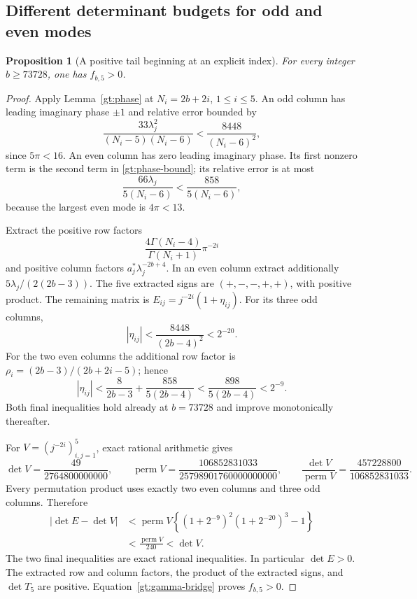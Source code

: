 \documentclass[11pt,a4paper]{article}
\newtheorem{proposition}[theorem]{Proposition}
\theoremstyle{definition}
\theoremstyle{remark}
\numberwithin{equation}{section}
\begin{document}
\subsection{Different determinant budgets for odd and even modes}

\begin{proposition}[A positive tail beginning at an explicit index]
\label{gt:positive-tail}
For every integer $b\ge73728$, one has $f_{b,5}>0$.
\end{proposition}

\begin{proof}
Apply Lemma~\ref{gt:phase} at $N_i=2b+2i$, $1\le i\le5$.
An odd column has leading imaginary phase $\pm1$ and relative
error bounded by
\[
 \frac{33\lambda_j^2}{(N_i-5)(N_i-6)}
                       <\frac{8448}{(N_i-6)^2},
\]
since $5\pi<16$. An even column has zero leading imaginary phase.
Its first nonzero term is the second term in
\eqref{gt:phase-bound}; its relative error is at most
\[
 \frac{66\lambda_j}{5(N_i-6)}
                       <\frac{858}{5(N_i-6)},
\]
because the largest even mode is $4\pi<13$.

Extract the positive row factors
\[
             \frac{4\Gamma(N_i-4)}{\Gamma(N_i+1)}\pi^{-2i}
\]
and positive column factors $a_j^*\lambda_j^{-2b+4}$.
In an even column extract additionally
$5\lambda_j/(2(2b-3))$. The five extracted signs are
$(+,-,-,+,+)$, with positive product. The remaining matrix is
$E_{ij}=j^{-2i}(1+\eta_{ij})$.
For its three odd columns,
\[
 |\eta_{ij}|<\frac{8448}{(2b-4)^2}<2^{-20}.
\]
For the two even columns the additional row factor is
$\rho_i=(2b-3)/(2b+2i-5)$; hence
\[
 |\eta_{ij}|
 <\frac8{2b-3}+\frac{858}{5(2b-4)}
 <\frac{898}{5(2b-4)}<2^{-9}.
\]
Both final inequalities hold already at $b=73728$ and improve
monotonically thereafter.

For $V=(j^{-2i})_{i,j=1}^{5}$, exact rational arithmetic gives
\begin{equation}\label{gt:V}
 \det V=\frac{49}{2764800000000},\qquad
 \operatorname{perm}V=\frac{106852831033}{25798901760000000000},
 \qquad
 \frac{\det V}{\operatorname{perm}V}
       =\frac{457228800}{106852831033}.
\end{equation}
Every permutation product uses exactly two even columns and three
odd columns. Therefore
\begin{align*}
 |\det E-\det V|
 &<\operatorname{perm}V
       \left\{(1+2^{-9})^2(1+2^{-20})^3-1\right\}\\
 &<\frac{\operatorname{perm}V}{240}<\det V.
\end{align*}
The two final inequalities are exact rational inequalities.
In particular $\det E>0$. The extracted row and column factors,
the product of the extracted signs, and $\det T_5$ are positive.
Equation~\eqref{gt:gamma-bridge} proves $f_{b,5}>0$.
\end{proof}
\end{document}
